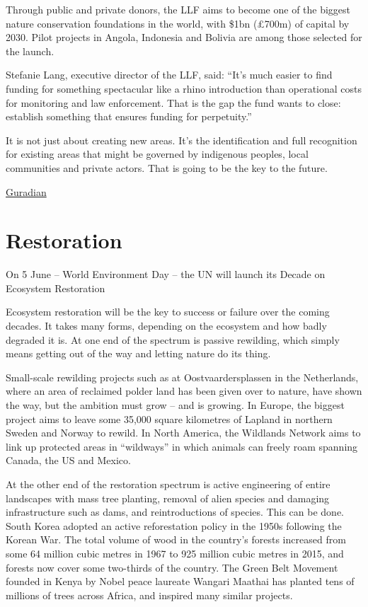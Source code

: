 \documentclass[
]{book}
\begin{document}
Through public and private donors, the LLF aims to become one of the biggest nature conservation foundations in the world, with \$1bn (£700m) of capital by 2030. Pilot projects in Angola, Indonesia and Bolivia are among those selected for the launch.

Stefanie Lang, executive director of the LLF, said: ``It's much easier to find funding for something spectacular like a rhino introduction than operational costs for monitoring and law enforcement. That is the gap the fund wants to close: establish something that ensures funding for perpetuity.''

It is not just about creating new areas. It's the identification and full recognition for existing areas that might be governed by indigenous peoples, local communities and private actors. That is going to be the key to the future.

\href{https://www.theguardian.com/environment/2021/may/19/governments-achieve-10-year-target-of-protecting-17-percent-land-aoe}{Guradian}

\hypertarget{restoration}{%
\section{Restoration}\label{restoration}}

On 5 June -- World Environment Day -- the UN will launch its Decade on Ecosystem Restoration

Ecosystem restoration will be the key to success or failure over the coming decades. It takes many forms, depending on the ecosystem and how badly degraded it is. At one end of the spectrum is passive rewilding, which simply means getting out of the way and letting nature do its thing.

Small-scale rewilding projects such as at Oostvaardersplassen in the Netherlands, where an area of reclaimed polder land has been given over to nature, have shown the way, but the ambition must grow -- and is growing. In Europe, the biggest project aims to leave some 35,000 square kilometres of Lapland in northern Sweden and Norway to rewild. In North America, the Wildlands Network aims to link up protected areas in ``wildways'' in which animals can freely roam spanning Canada, the US and Mexico.

At the other end of the restoration spectrum is active engineering of entire landscapes with mass tree planting, removal of alien species and damaging infrastructure such as dams, and reintroductions of species. This can be done. South Korea adopted an active reforestation policy in the 1950s following the Korean War. The total volume of wood in the country's forests increased from some 64 million cubic metres in 1967 to 925 million cubic metres in 2015, and forests now cover some two-thirds of the country. The Green Belt Movement founded in Kenya by Nobel peace laureate Wangari Maathai has planted tens of millions of trees across Africa, and inspired many similar projects.
\end{document}
